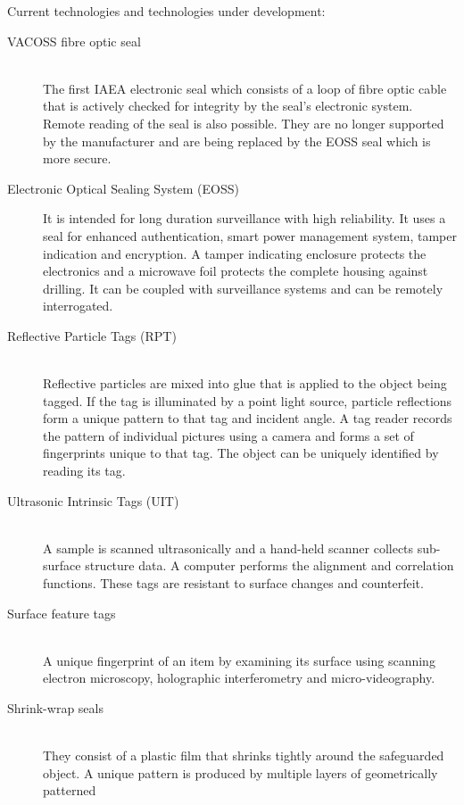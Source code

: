\documentclass[twoside,titlepage,11pt,twocolumn,a4paper]{article}
\begin{document}
Current technologies and technologies under development:
\citep{zarimpas2003}
\begin{description}
  \item[VACOSS fibre optic seal] \hfill \\ The first IAEA electronic
    seal which consists of a loop of fibre optic cable that is
    actively checked for integrity by the seal’s electronic
    system. Remote reading of the seal is also possible. They are no
    longer supported by the manufacturer and are being replaced by the
    EOSS seal which is more secure. \citep{IAEAsafeguards2011}
  \item[Electronic Optical Sealing System (EOSS)] It is intended for
    long duration surveillance with high reliability. It uses a seal
    for enhanced authentication, smart power management system, tamper
    indication and encryption. A tamper indicating enclosure protects
    the electronics and a microwave foil protects the complete housing
    against drilling. It can be coupled with surveillance systems and
    can be remotely interrogated. \citep{IAEAsafeguards2011}
  \item[Reflective Particle Tags (RPT)] \hfill \\ Reflective particles
    are mixed into glue that is applied to the object being tagged. If
    the tag is illuminated by a point light source, particle
    reflections form a unique pattern to that tag and incident
    angle. A tag reader records the pattern of individual pictures
    using a camera and forms a set of fingerprints unique to that
    tag. The object can be uniquely identified by reading its
    tag. \citep{ellis2007}
  \item[Ultrasonic Intrinsic Tags (UIT)] \hfill \\ A sample is scanned
    ultrasonically and a hand-held scanner collects sub-surface
    structure data. A computer performs the alignment and correlation
    functions. These tags are resistant to surface changes and
    counterfeit.
  \item[Surface feature tags] \hfill \\ A unique fingerprint of an
    item by examining its surface using scanning electron microscopy,
    holographic interferometry and micro-videography.
  \item[Shrink-wrap seals] \hfill \\ They consist of a plastic film
    that shrinks tightly around the safeguarded object. A unique
    pattern is produced by multiple layers of geometrically patterned

\end{description}
\end{document}
